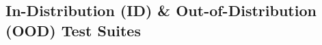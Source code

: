 \subsection{In-Distribution (ID) \& Out-of-Distribution (OOD) Test Suites}
\label{subsec:task_protocol}






